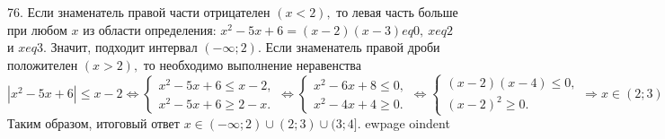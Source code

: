 76. Если знаменатель правой части отрицателен $(x<2),$ то левая часть больше при любом $x$ из области определения: $x^2-5x+6=(x-2)(x-3)
eq0,\ x
eq2$ и $x
eq3.$ Значит, подходит интервал $(-\infty;2).$ Если знаменатель правой дроби положителен $(x>2),$ то необходимо выполнение неравенства $|x^2-5x+6|\leqslant x-2\Leftrightarrow \begin{cases} x^2-5x+6\leqslant x-2,\\ x^2-5x+6\geqslant 2-x.\end{cases}\Leftrightarrow \begin{cases} x^2-6x+8\leqslant0,\\ x^2-4x+4\geqslant0.\end{cases}
\Leftrightarrow \begin{cases} (x-2)(x-4)\leqslant0,\\ (x-2)^2\geqslant0.\end{cases}\Rightarrow x\in(2;3)\cup(3;4].$ Таким образом, итоговый ответ $x\in(-\infty;2)\cup (2;3)\cup(3;4].$
ewpage
oindent

